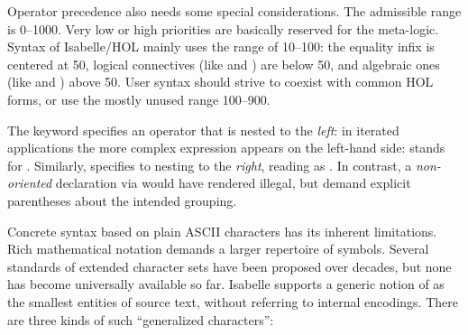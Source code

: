 \begin{isabellebody}
\begin{isamarkuptext}
  Operator precedence also needs some special considerations.  The
  admissible range is 0--1000.  Very low or high priorities are
  basically reserved for the meta-logic.  Syntax of Isabelle/HOL
  mainly uses the range of 10--100: the equality infix \isa{{\isacharequal}} is
  centered at 50, logical connectives (like \isa{{\isasymor}} and \isa{{\isasymand}}) are below 50, and algebraic ones (like \isa{{\isacharplus}} and \isa{{\isacharasterisk}}) above 50.  User syntax should strive to coexist with common
  HOL forms, or use the mostly unused range 100--900.

  The keyword  specifies an operator that is nested
  to the \emph{left}: in iterated applications the more complex
  expression appears on the left-hand side: 
  stands for .  Similarly,
   specifies to nesting to the \emph{right},
  reading  as .  In
  contrast, a \emph{non-oriented} declaration via 
  would have rendered  illegal, but demand
  explicit parentheses about the intended grouping.%
\end{isamarkuptext}%
\isamarkuptrue%
%
\isamarkuptrue%
%
\begin{isamarkuptext}%
Concrete syntax based on plain ASCII characters has its inherent
  limitations.  Rich mathematical notation demands a larger repertoire
  of symbols.  Several standards of extended character sets have been
  proposed over decades, but none has become universally available so
  far.  Isabelle supports a generic notion of  as the
  smallest entities of source text, without referring to internal
  encodings.  There are three kinds of such ``generalized
  characters'':

  \begin{enumerate}


\end{enumerate}
\end{isamarkuptext}
\end{isabellebody}
